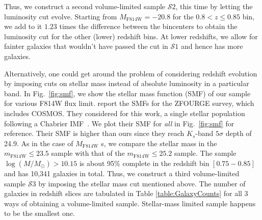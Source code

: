\documentclass[twocolumn,useAMS,usenatbib]{mn2e}
\newcommand{\s}{\ensuremath{\mathcal{S}}}
\begin{document}
Thus, we construct a second volume-limited sample \s$2$, this time by letting the luminosity cut evolve. Starting from $M_\text{F814W} = -20.8$ for the $0.8<z\le0.85$ bin, we add to it $1.23$ times the difference between the
bincenters to obtain the luminosity cut for the other (lower) redshift bins. At lower redshifts, we allow for fainter galaxies that wouldn't have passed the cut in \s$1$ and hence has more galaxies.



Alternatively, one could get around the problem of considering redshift evolution by imposing cuts on stellar mass instead of absolute luminosity in a particular band. In Fig.~\ref{fig:smf}, we show the stellar mass function (SMF) of our sample for various F814W flux limit.
\cite{Tomczak_SMF} report the SMFs for the ZFOURGE survey, which includes COSMOS. They considered for this work, a single stellar population following a Chabrier IMF~\citep{ChabrierIMF}. 
We plot their SMF for \emph{all} in Fig.~\ref{fig:smf} for
reference. Their SMF is higher than ours since they reach $K_s$-band
$5\sigma$ depth of 24.9. 
As in the case of $M_\text{F814W}$ s, we compare the stellar mass in the $m_\text{F814W}\le23.5$ sample with that of the $m_\text{F814W}\le25.2$ sample. 
The sample $\log(M/M_\odot) > 10.15$ is about 95\% complete in the redshift bin $\left[ 0.75 - 0.85\right]$ and has 10,341 galaxies in total.
Thus, we construct a third volume-limited sample \s$3$ by imposing the stellar mass cut mentioned above. The number of galaxies in redshift slices
are tabulated in Table \ref{table:GalaxyCounts} for all 3 ways of obtaining a volume-limited sample. Stellar-mass limited sample happens to be the smallest one.
\end{document}
